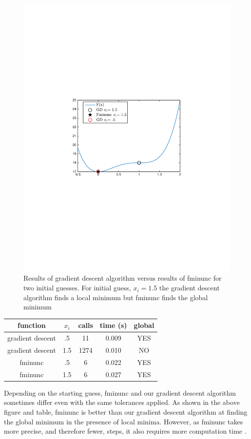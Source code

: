 \documentclass[10pt,twocolumn]{article}
\begin{document}
\begin{figure}[H]
\label{fig: fminunc}
\center
\includegraphics[scale =.6]{comparetofminunc.pdf}
\caption{Results of gradient descent algorithm versus results of fminunc for two initial guesses. For initial guess, $x_i= 1.5$ the gradient descent algorithm finds a local minimum but fminunc finds the global minimum}
\end{figure}
 

\begin{center}
  \begin{tabular}{ | c | c | c | c | c | }
    \hline
     function & $x_i$ & calls &  time (s) & global \\ \hline
     gradient descent & .5 &  11 &  0.009 & YES \\ \hline
     gradient descent & 1.5 & 1274  & 0.010 & NO \\ \hline
    fminunc & .5  & 6 & 0.022 & YES  \\ \hline
      fminunc &1.5 & 6 & 0.027 & YES \\ 
    \hline
  \end{tabular}
\end{center}
Depending on the starting guess, fminunc and our gradient descent algorithm sometimes differ even with the same tolerances applied. As shown in the above figure and table, fminunc is better than our gradient descent algorithm at finding the global minimum in the presence of local minima.  However, as fminunc takes more precise, and therefore fewer, steps,  it also requires more computation time .
\end{document}
